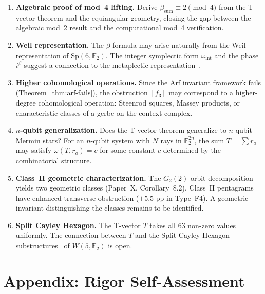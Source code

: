 \documentclass[11pt,a4paper]{article}
\theoremstyle{remark}
\newcommand{\F}{\mathbb{F}}
\begin{document}
\begin{enumerate}
  \item \textbf{Algebraic proof of mod~4 lifting.}
    Derive $\beta_{\text{sum}} \equiv 2 \pmod{4}$ from the T-vector
    theorem and the equiangular geometry, closing the gap between the
    algebraic mod~2 result and the computational mod~4 verification.

  \item \textbf{Weil representation.}
    The $\beta$-formula may arise naturally from the Weil representation
    of $\text{Sp}(6, \F_2)$. The integer symplectic form
    $\omega_{\text{int}}$ and the phase $i^{\beta}$ suggest a connection
    to the metaplectic representation~\cite{LionVergne}.

  \item \textbf{Higher cohomological operations.}
    Since the Arf invariant framework fails
    (Theorem~\ref{thm:arf-fails}), the obstruction $[f_3]$ may
    correspond to a higher-degree cohomological operation: Steenrod
    squares, Massey products, or characteristic classes of a gerbe on
    the context complex.

  \item \textbf{$n$-qubit generalization.}
    Does the T-vector theorem generalize to $n$-qubit Mermin stars?
    For an $n$-qubit system with $N$ rays in $\F_2^{2n}$, the sum $T =
    \sum r_a$ may satisfy $\omega(T, r_a) = c$ for some constant $c$
    determined by the combinatorial structure.

  \item \textbf{Class~II geometric characterization.}
    The $G_2(2)$ orbit decomposition yields two geometric classes
    (Paper~X, Corollary~8.2). Class~II pentagrams have enhanced
    transverse obstruction ($+5.5$ pp in Type~F4). A geometric
    invariant distinguishing the classes remains to be identified.

  \item \textbf{Split Cayley Hexagon.}
    The T-vector $T$ takes all 63 non-zero values uniformly. The
    connection between $T$ and the Split Cayley Hexagon
    substructures~\cite{LevayPlanatSaniga} of $W(5, \F_2)$ is open.
\end{enumerate}

\section*{Appendix: Rigor Self-Assessment}
\label{app:rigor}
\end{document}
